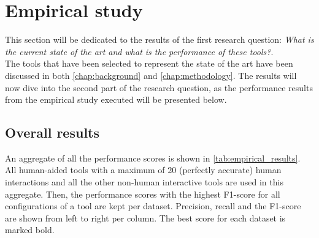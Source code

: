 \section{Empirical study}
This section will be dedicated to the results of the first research question: \textit{What is the current state of the art and what is the performance of these tools?}. 
~\\The tools that have been selected to represent the state of the art have been discussed in both \autoref{chap:background} and \autoref{chap:methodology}. The results will now dive into the second part of the research question, as the performance results from the empirical study executed will be presented below. 

\subsection{Overall results}
\label{subsec:empirical_overall_results}
An aggregate of all the performance scores is shown in \autoref{tab:empirical_results}. All human-aided tools with a maximum of 20 (perfectly accurate) human interactions and all the other non-human interactive tools are used in this aggregate. Then, the performance scores with the highest F1-score for all configurations of a tool are kept per dataset. Precision, recall and the F1-score are shown from left to right per column. The best score for each dataset is marked bold.

